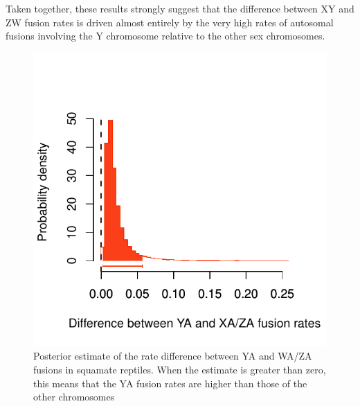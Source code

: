 \documentclass[12pt,twoside]{article}
\begin{document}
Taken together, these results strongly suggest that the difference between XY and ZW fusion rates is driven almost entirely by the very high rates of autosomal fusions involving the Y chromosome relative to the other sex chromosomes.

\begin{figure}[p]
\centering
\includegraphics[scale=1.25]{figs/chromosome-fusion-squa}
\caption{Posterior estimate of the rate difference between YA and WA/ZA fusions in squamate reptiles. When the estimate is greater than zero, this means that the YA fusion rates are higher than those of the other chromosomes}
\label{fig:squa-ind}
\end{figure}

\clearpage


\end{document}
